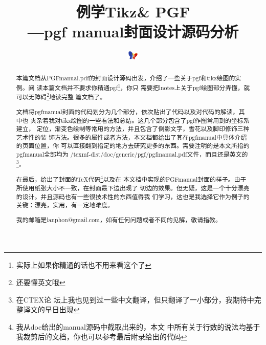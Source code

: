 \documentclass[10pt,a4paper,titlepage]{article}
\begin{document}
\pagestyle{plain}%

\title{\Huge{例学Tikz\& PGF}\\ \vspace{10pt}---\large{pgf manual封面设计源码分析}}
\date{\modeldate}
\author{
\Huge{%
\modelauthornet}
\includegraphics[width=1.68em]{pic/byrlogo.png}
}
\maketitle

\tableofcontents


\listoffigures

\clearpage
{}
{}

\begin{abstract}

本篇文档从PGFmanual.pdf的封面设计源码出发，介绍了一些关于pgf和tikz绘图的实例。阅
读本篇文档并不要求你精通pgf\footnote{实际上如果你精通的话也不用来看这个了}，你只
需要把lnotes上关于pgf绘图部分弄懂，就可以无障碍\footnote{还要懂英文哦}地读完整
篇文档了。

文档将pgfmanual封面的代码划分为几个部分，依次贴出了代码以及对代码的解读，其中也
夹杂着我对tikz绘图的一些看法和总结。这几个部分包含了pgf作图常用到的坐标系建立，
定位，渐变色绘制等常用的方法，并且包含了倒影文字，雪花以及脚印修饰三种艺术性的装
饰方法。很多的属性或者方法，本文档都给出了其在pgfmanual中具体介绍的页面位置，你
可以直接翻到指定的地方去研究更多的东西。需要注明的是本文所指的pgfmanual全部均为
/texmf-dist/doc/generic/pgf/pgfmanual.pdf文件，而且还是英文的\footnote{在CTEX论
坛上我也见到过一些中文翻译，但只翻译了一小部分，我期待中完整译文的早日出现}。

在最后，给出了封面的\TeX 代码\footnote{我从doc给出的manual源码中截取出来的，本文
中所有关于行数的说法均基于我裁剪后的文档，你也可以参考最后附录给出的代码}以及在
本文档中实现的PGFmanual封面的样子。由于所使用纸张大小不一致，在封面最下边出现了
切边的效果。但无疑，这是一个十分漂亮的设计。并且源码也有一些很技术性的东西值得我
们学习，这也是我选择它作为例子的关键：漂亮，实用，有一定地难度。

我的邮箱是lanphon@gmail.com，如有任何问题或者不同的见解，敬请指教。

\end{abstract}

%
\end{document}
